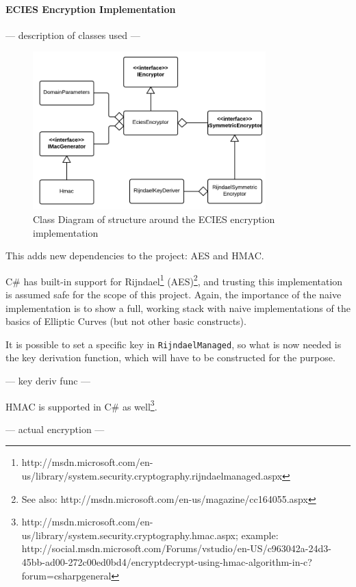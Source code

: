 \paragraph{ECIES Encryption Implementation}

--- description of classes used ---

\begin{figure}[ht!]
	\centering
	\includegraphics[width=90mm]{img/naive_implementation__encryption__ecies_class_diagram.png}
	\caption{Class Diagram of structure around the ECIES encryption implementation}
	\label{ecies_class_diagram}
\end{figure}

This adds new dependencies to the project: AES and HMAC.

C\# has built-in support for Rijndael\footnote{http://msdn.microsoft.com/en-us/library/system.security.cryptography.rijndaelmanaged.aspx}
(AES)\footnote{See also: http://msdn.microsoft.com/en-us/magazine/cc164055.aspx}, and trusting this implementation is assumed safe for
the scope of this project. Again, the importance of the naive implementation is to show a full, working stack with naive implementations
of the basics of Elliptic Curves (but not other basic constructs).

It is possible to set a specific key in \verb+RijndaelManaged+, so what is now needed is the key derivation function, which will have to
be constructed for the purpose.

--- key deriv func ---

HMAC is supported in C\# as well\footnote{http://msdn.microsoft.com/en-us/library/system.security.cryptography.hmac.aspx; example: http://social.msdn.microsoft.com/Forums/vstudio/en-US/c963042a-24d3-45bb-ad00-272c00ed0bd4/encryptdecrypt-using-hmac-algorithm-in-c?forum=csharpgeneral}.

--- actual encryption ---